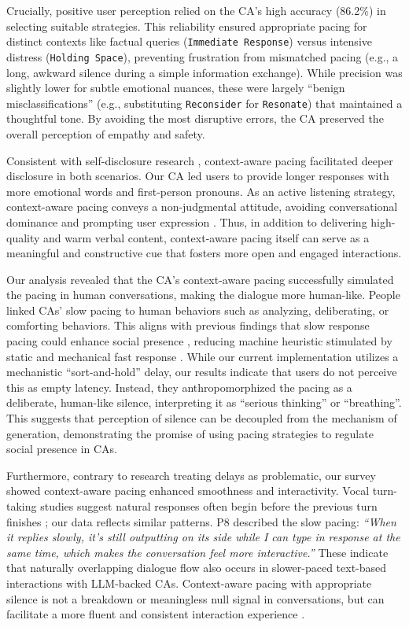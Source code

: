 Crucially, positive user perception relied on the CA's high accuracy (86.2\%) in selecting suitable strategies. This reliability ensured appropriate pacing for distinct contexts like factual queries (\texttt{Immediate Response}) versus intensive distress (\texttt{Holding Space}), preventing frustration from mismatched pacing (e.g., a long, awkward silence during a simple information exchange). While precision was slightly lower for subtle emotional nuances, these were largely ``benign misclassifications'' (e.g., substituting \texttt{Reconsider} for \texttt{Resonate}) that maintained a thoughtful tone. By avoiding the most disruptive errors, the CA preserved the overall perception of empathy and safety.

Consistent with self-disclosure research \cite{10.1145/3555164}, context-aware pacing facilitated deeper disclosure in both scenarios. Our CA led users to provide longer responses with more emotional words and first-person pronouns. As an active listening strategy, context-aware pacing conveys a non-judgmental attitude, avoiding conversational dominance and prompting user expression \cite{johansson2016making}. Thus, in addition to delivering high-quality and warm verbal content, context-aware pacing itself can serve as a meaningful and constructive cue that fosters more open and engaged interactions. 

Our analysis revealed that the CA's context-aware pacing successfully simulated the pacing in human conversations, making the dialogue more human-like. People linked CAs' slow pacing to human behaviors such as analyzing, deliberating, or comforting behaviors. This aligns with previous findings that slow response pacing could enhance social presence \cite{gnewuch2022opposing}, reducing machine heuristic stimulated by static and mechanical fast response \cite{10.1145/3290605.3300768,appel2012does}. 
While our current implementation utilizes a mechanistic ``sort-and-hold'' delay, our results indicate that users do not perceive this as empty latency. Instead, they anthropomorphized the pacing as a deliberate, human-like silence, interpreting it as ``serious thinking'' or ``breathing''. This suggests that perception of silence can be decoupled from the mechanism of generation, demonstrating the promise of using pacing strategies to regulate social presence in CAs.

Furthermore, contrary to research treating delays as problematic, our survey showed context-aware pacing enhanced smoothness and interactivity. Vocal turn-taking studies suggest natural responses often begin before the previous turn finishes \cite{heldner2010pauses}; our data reflects similar patterns. P8 described the slow pacing: \textit{``When it replies slowly, it's still outputting on its side while I can type in response at the same time, which makes the conversation feel more interactive.''} These indicate that naturally overlapping dialogue flow also occurs in slower-paced text-based interactions with LLM-backed CAs. Context-aware pacing with appropriate silence is not a breakdown or meaningless null signal in conversations, but can facilitate a more fluent and consistent interaction experience \cite{10.1145/3719160.3736636}. 


